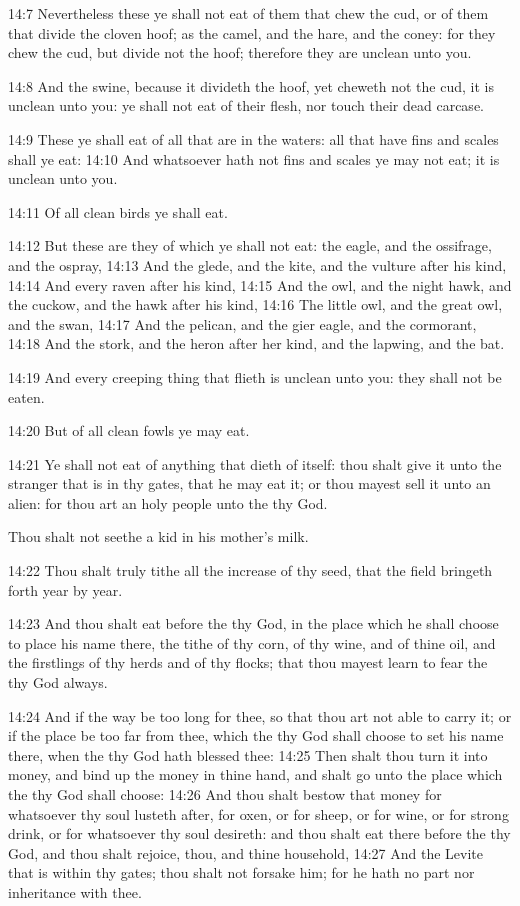 14:7 Nevertheless these ye shall not eat of them that chew the cud, or
of them that divide the cloven hoof; as the camel, and the hare, and
the coney: for they chew the cud, but divide not the hoof; therefore
they are unclean unto you.

14:8 And the swine, because it divideth the hoof, yet cheweth not the
cud, it is unclean unto you: ye shall not eat of their flesh, nor
touch their dead carcase.

14:9 These ye shall eat of all that are in the waters: all that have
fins and scales shall ye eat: 14:10 And whatsoever hath not fins and
scales ye may not eat; it is unclean unto you.

14:11 Of all clean birds ye shall eat.

14:12 But these are they of which ye shall not eat: the eagle, and the
ossifrage, and the ospray, 14:13 And the glede, and the kite, and the
vulture after his kind, 14:14 And every raven after his kind, 14:15
And the owl, and the night hawk, and the cuckow, and the hawk after
his kind, 14:16 The little owl, and the great owl, and the swan, 14:17
And the pelican, and the gier eagle, and the cormorant, 14:18 And the
stork, and the heron after her kind, and the lapwing, and the bat.

14:19 And every creeping thing that flieth is unclean unto you: they
shall not be eaten.

14:20 But of all clean fowls ye may eat.

14:21 Ye shall not eat of anything that dieth of itself: thou shalt
give it unto the stranger that is in thy gates, that he may eat it; or
thou mayest sell it unto an alien: for thou art an holy people unto
the \LORD thy God.

Thou shalt not seethe a kid in his mother's milk.

14:22 Thou shalt truly tithe all the increase of thy seed, that the
field bringeth forth year by year.

14:23 And thou shalt eat before the \LORD thy God, in the place which
he shall choose to place his name there, the tithe of thy corn, of thy
wine, and of thine oil, and the firstlings of thy herds and of thy
flocks; that thou mayest learn to fear the \LORD thy God always.

14:24 And if the way be too long for thee, so that thou art not able
to carry it; or if the place be too far from thee, which the \LORD thy
God shall choose to set his name there, when the \LORD thy God hath
blessed thee: 14:25 Then shalt thou turn it into money, and bind up
the money in thine hand, and shalt go unto the place which the \LORD
thy God shall choose: 14:26 And thou shalt bestow that money for
whatsoever thy soul lusteth after, for oxen, or for sheep, or for
wine, or for strong drink, or for whatsoever thy soul desireth: and
thou shalt eat there before the \LORD thy God, and thou shalt rejoice,
thou, and thine household, 14:27 And the Levite that is within thy
gates; thou shalt not forsake him; for he hath no part nor inheritance
with thee.

